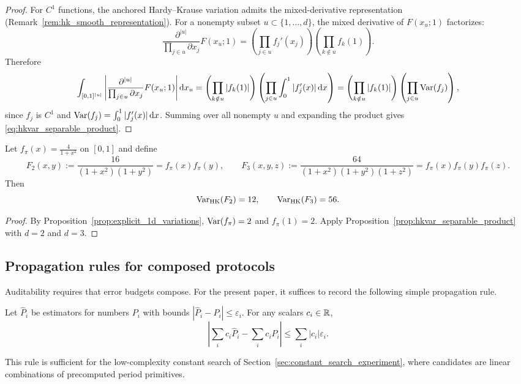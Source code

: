 \begin{proof}
For $C^1$ functions, the anchored Hardy--Krause variation admits the mixed-derivative representation (Remark~\ref{rem:hk_smooth_representation}). For a nonempty subset $u\subset\{1,\dots,d\}$, the mixed derivative of $F(x_u;1)$ factorizes:
\[
\frac{\partial^{|u|}}{\prod_{j\in u}\partial x_j}F(x_u;1)
=
\left(\prod_{j\in u} f_j'(x_j)\right)\left(\prod_{k\notin u} f_k(1)\right).
\]
Therefore
\[
\int_{[0,1]^{|u|}}
\left|
\frac{\partial^{|u|}}{\prod_{j\in u}\partial x_j}F(x_u;1)
\right|
\mathrm{d} x_u
=
\left(\prod_{k\notin u}|f_k(1)|\right)\left(\prod_{j\in u}\int_0^1 |f_j'(x)|\,\mathrm{d} x\right)
=
\left(\prod_{k\notin u}|f_k(1)|\right)\left(\prod_{j\in u}\mathrm{Var}(f_j)\right),
\]
since $f_j$ is $C^1$ and $\mathrm{Var}(f_j)=\int_0^1|f_j'(x)|\,\mathrm{d} x$. Summing over all nonempty $u$ and expanding the product gives \eqref{eq:hkvar_separable_product}.
\end{proof}

\begin{corollary}
\label{cor:hkvar_pi2_pi3}
Let $f_\pi(x)=\frac{4}{1+x^2}$ on $[0,1]$ and define
\[
F_2(x,y):=\frac{16}{(1+x^2)(1+y^2)}=f_\pi(x)f_\pi(y),
\qquad
F_3(x,y,z):=\frac{64}{(1+x^2)(1+y^2)(1+z^2)}=f_\pi(x)f_\pi(y)f_\pi(z).
\]
Then
\begin{equation}
\label{eq:hkvar_pi2_pi3}
\mathrm{Var}_{\mathrm{HK}}(F_2)=12,
\qquad
\mathrm{Var}_{\mathrm{HK}}(F_3)=56.
\end{equation}
\end{corollary}

\begin{proof}
By Proposition~\ref{prop:explicit_1d_variations}, $\mathrm{Var}(f_\pi)=2$ and $f_\pi(1)=2$. Apply Proposition~\ref{prop:hkvar_separable_product} with $d=2$ and $d=3$.
\end{proof}

\subsection{Propagation rules for composed protocols}
\label{sec:propagation_rules}

Auditability requires that error budgets compose. For the present paper, it suffices to record the following simple propagation rule.

\begin{lemma}
\label{lem:linear_combination_rule}
Let $\widehat{P}_i$ be estimators for numbers $P_i$ with bounds $|\widehat{P}_i-P_i|\le \varepsilon_i$. For any scalars $c_i\in\mathbb{R}$,
\begin{equation}
\label{eq:linear_combination_error}
\left|\sum_i c_i\widehat{P}_i - \sum_i c_i P_i\right|\le \sum_i |c_i|\varepsilon_i.
\end{equation}
\end{lemma}

This rule is sufficient for the low-complexity constant search of Section~\ref{sec:constant_search_experiment}, where candidates are linear combinations of precomputed period primitives.



